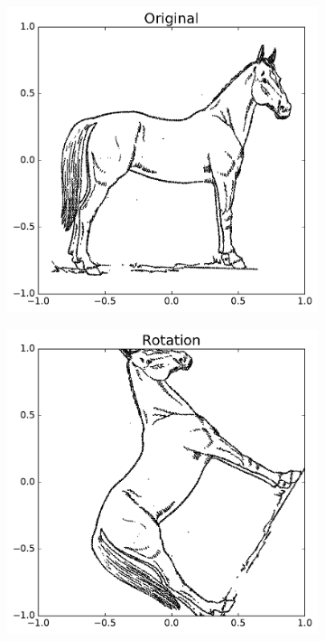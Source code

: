 \begin{figure}[H] %
\captionsetup[subfigure]{justification=centering}
\centering
\begin{subfigure}{.5\textwidth}
    \centering
    \includegraphics[width=\linewidth]{originalHorse.pdf}
\end{subfigure}%
\begin{subfigure}{.5\textwidth}
    \centering
    \includegraphics[width=\linewidth]{RotationHorse.pdf}
\end{subfigure}
\label{fig:rotate}
\end{figure}

